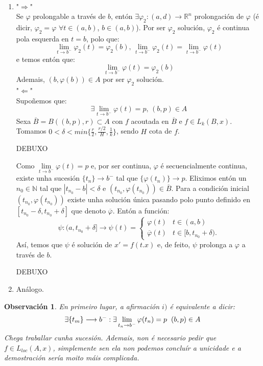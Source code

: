\documentclass[11pt, a4paper,twoside]{article}
\makeatletter
\theoremstyle{theorem-style}  %
\renewenvironment{proof}[1][\proofname]{\par
	\pushQED{\qed}%
	\normalfont \topsep6\p@\@plus6\p@\relax
	\list{}{%
		\settowidth{\leftmargin}{\quad:\hskip\labelsep}%
		\setlength{\labelwidth}{0pt}%
		\setlength{\itemindent}{-\leftmargin}%
	}%
	\item[\hskip\labelsep\itshape#1\@addpunct{:}]\ignorespaces
}{%
	\popQED\endlist\@endpefalse
}
\theoremstyle{definition-style}
\newtheorem*{observation}{Observación} %
\theoremstyle{example-style}
\providecommand{\abs}[1]{\left\lvert#1\right\rvert} %
\makeatother
\begin{document}
\begin{proof}\ 
	\begin{enumerate} [\quad i)]
		\item "$\Rightarrow$" \\
		Se $\varphi$ prolongable a través de $b$, entón $\exists \varphi_2 : (a, d) \longrightarrow \mathbb{R}^n$ prolongación de $\varphi$ (é dicir, $\varphi_2 = \varphi$ $\forall t \in (a, b)$, $b \in (a, b)$). Por ser $\varphi_2$ solución, $\varphi_2$ é continua pola esquerda en $t = b$, polo que:
		\[\lim\limits_{t \to b^-} \varphi_2(t) = \varphi_2(b) \text{, } \lim\limits_{t \to b^-} \varphi_2(t) = \lim\limits_{t \to b^-} \varphi(t)\]
		e temos entón que:
		\[\lim\limits_{t \to b^-} \varphi(t) = \varphi_2(b)\]
		Ademais, $(b, \varphi(b)) \in A$ por ser $\varphi_2$ solución. \\
		"$\Leftarrow$" \\
		Supoñemos que:
		\[\exists \lim\limits_{t \to b^-} \varphi(t) = p \text{, } (b, p) \in A\]
		Sexa $\overline{B} = B((b, p), r) \subset A$ con $f$ acoutada en $\overline{B}$ e $f \in L_k (B, x)$. Tomamos $0 < \delta < min\{\frac{r}{2}, \frac{r/2}{H}, \frac{1}{k}\}$, sendo $H$ cota de $f$.
		
		DEBUXO
		
		Como $\lim\limits_{t \to b^-} \varphi (t) = p$ e, por ser continua, $ \varphi $ é secuencialmente continua, existe unha sucesión $\{t_n\} \longrightarrow b^-$ tal que $\{\varphi(t_n)\} \longrightarrow p$. Eliximos entón un $n_0 \in \mathbb{N}$ tal que $\abs{t_{n_0} - b} < \delta$ e $(t_{n_0}, \varphi (t_{n_0})) \in \overline{B}$. Para a condición inicial $(t_{n_0}, \varphi (t_{n_0}))$ existe unha solución única pasando polo punto definido en $[t_{n_0} - \delta, t_{n_0} + \delta]$ que denoto $\overline{\varphi}$. Entón a función:
		\[\psi: (a, t_{n_0} + \delta] \longrightarrow \psi (t) = \begin{cases}
		\varphi(t) &t \in (a, b) \\ 
		\overline{\varphi} (t) &t \in [b, t_{n_0} + \delta).
		\end{cases}\]
		Así, temos que $\psi$ é solución de $x' = f(t. x)$ e, de feito, $\psi$ prolonga a $\varphi$ a través de $b$.
		
		DEBUXO
		\item Análogo.
	\end{enumerate} 
\end{proof}
\begin{observation}
	En primeiro lugar, a afirmación $i)$ é equivalente a dicir:
	\[\exists \{t_m\} \longrightarrow b^- : \exists \lim\limits_{t_n \to b^-} \varphi(t_n) = p \hspace{0.2cm} (b, p) \in A\]
	Chega traballar cunha sucesión. Ademais, non é necesario pedir que $f \in L_{loc}(A, x)$, simplemente sen ela non podemos concluír a unicidade e a demostración sería moito máis complicada.
\end{observation}
\end{document}

